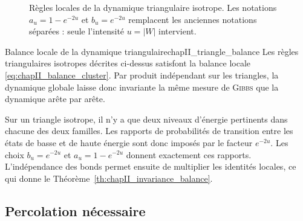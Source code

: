 \begin{figure}[H]
\centering
{}
\caption{Règles locales de la dynamique triangulaire isotrope. Les notations $a_u=1-e^{-2u}$ et $b_u=e^{-2u}$ remplacent les anciennes notations séparées : seule l'intensité $u=|W|$ intervient.}
\label{fig:chapII_triangle_rules}
\end{figure}

\begin{Fait}{Balance locale de la dynamique triangulaire}{chapII_triangle_balance}
Les règles triangulaires isotropes décrites ci-dessus satisfont la balance locale \eqref{eq:chapII_balance_cluster}. Par produit indépendant sur les triangles, la dynamique globale laisse donc invariante la même mesure de \textsc{Gibbs} que la dynamique arête par arête.
\end{Fait}

\begin{Preuve}
Sur un triangle isotrope, il n'y a que deux niveaux d'énergie pertinents dans chacune des deux familles. Les rapports de probabilités de transition entre les états de basse et de haute énergie sont donc imposés par le facteur $e^{-2u}$. Les choix $b_u=e^{-2u}$ et $a_u=1-e^{-2u}$ donnent exactement ces rapports. L'indépendance des bonds permet ensuite de multiplier les identités locales, ce qui donne le Théorème~\ref{th:chapII_invariance_balance}.
\end{Preuve}

\subsection{Percolation nécessaire}

